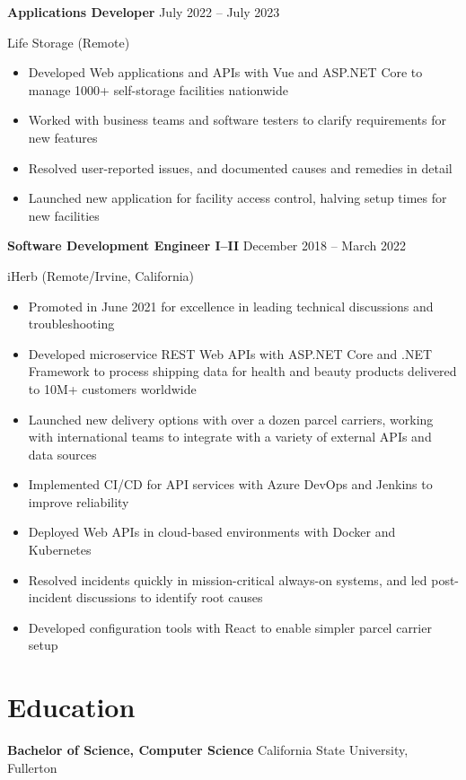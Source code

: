 \documentclass[12pt]{article}
\newcommand{\titleheader}[2]{\textbf{#1} \symbol{"B7} #2}
\newcommand{\locheader}[2]{#1 (#2)}
\begin{document}
	\titleheader{Applications Developer}{July 2022 -- July 2023}

	\locheader{Life Storage}{Remote}

	\begin{itemize}
		\item Developed Web applications and APIs with Vue and ASP.NET Core to manage 1000+ self-storage facilities nationwide
		\item Worked with business teams and software testers to clarify requirements for new features
		\item Resolved user-reported issues, and documented causes and remedies in detail
		\item Launched new application for facility access control, halving setup times for new facilities
	\end{itemize}

	\titleheader{Software Development Engineer I--II}{December 2018 -- March 2022}

	\locheader{iHerb}{Remote/Irvine, California}

	\begin{itemize}
		\item Promoted in June 2021 for excellence in leading technical discussions and troubleshooting
		\item Developed microservice REST Web APIs with ASP.NET Core and .NET Framework to process shipping data for health and beauty products delivered to 10M+ customers worldwide
		\item Launched new delivery options with over a dozen parcel carriers, working with international teams to integrate with a variety of external APIs and data sources
		\item Implemented CI/CD for API services with Azure DevOps and Jenkins to improve reliability
		\item Deployed Web APIs in cloud-based environments with Docker and Kubernetes
		\item Resolved incidents quickly in mission-critical always-on systems, and led post-incident discussions to identify root causes
		\item Developed configuration tools with React to enable simpler parcel carrier setup
	\end{itemize}

	\section*{Education}

	\textbf{Bachelor of Science, Computer Science}  California State University, Fullerton
\end{document}
